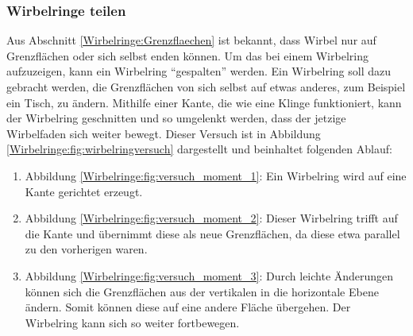 \subsubsection{Wirbelringe teilen}
%
Aus Abschnitt \ref{Wirbelringe:Grenzflaechen} ist bekannt, dass Wirbel nur auf Grenzflächen oder sich selbst enden können. 
Um das bei einem Wirbelring aufzuzeigen, kann ein Wirbelring ``gespalten'' werden. 
Ein Wirbelring soll dazu gebracht werden, die Grenzflächen von sich selbst auf etwas anderes, zum Beispiel ein Tisch, zu ändern. 
Mithilfe einer Kante, die wie eine Klinge funktioniert, kann der Wirbelring geschnitten und so umgelenkt werden, dass der jetzige Wirbelfaden sich weiter bewegt. 
Dieser Versuch ist in Abbildung \ref{Wirbelringe:fig:wirbelringversuch} dargestellt und beinhaltet folgenden Ablauf:



\begin{enumerate}
    \item Abbildung \ref{Wirbelringe:fig:versuch_moment_1}: Ein Wirbelring wird auf eine Kante gerichtet erzeugt.
    \item Abbildung \ref{Wirbelringe:fig:versuch_moment_2}: Dieser Wirbelring trifft auf die Kante und übernimmt diese als neue Grenzflächen, da diese etwa parallel zu den vorherigen waren.
    \item Abbildung \ref{Wirbelringe:fig:versuch_moment_3}: Durch leichte Änderungen können sich die Grenzflächen aus der vertikalen in die horizontale Ebene ändern.
    Somit können diese auf eine andere Fläche übergehen.
    Der Wirbelring kann sich so weiter fortbewegen.
\end{enumerate}
    
